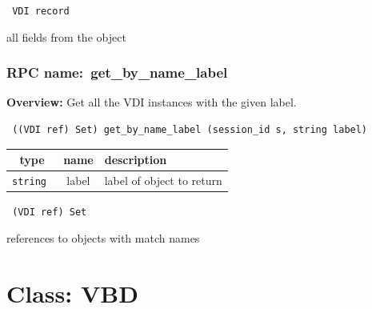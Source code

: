\vspace{0.3cm}

{\tt 
VDI record
}


all fields from the object
\vspace{0.3cm}
\vspace{0.3cm}
\vspace{0.3cm}
\subsubsection{RPC name:~get\_by\_name\_label}

{\bf Overview:} 
Get all the VDI instances with the given label.

\begin{verbatim} ((VDI ref) Set) get_by_name_label (session_id s, string label)\end{verbatim}



 
\vspace{0.3cm}
\begin{tabular}{|c|c|p{7cm}|}
 \hline
{\bf type} & {\bf name} & {\bf description} \\ \hline
{\tt string } & label & label of object to return \\ \hline 

\end{tabular}

\vspace{0.3cm}

{\tt 
(VDI ref) Set
}


references to objects with match names
\vspace{0.3cm}
\vspace{0.3cm}
\vspace{0.3cm}

\vspace{1cm}
\newpage
\section{Class: VBD}
